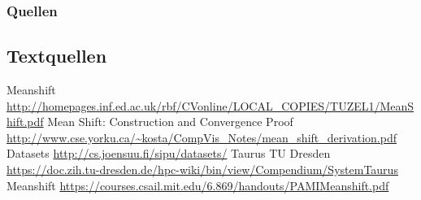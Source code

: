 \documentclass[10pt,utf8]{beamer}
\begin{document}
\begin{frame}
\frametitle{Quellen}
\framesubtitle{}
\tiny
\subsection*{Textquellen}
	\begin{itemize}[]
		\bibitem [0] {} Meanshift \url{http://homepages.inf.ed.ac.uk/rbf/CVonline/LOCAL_COPIES/TUZEL1/MeanShift.pdf}
		\bibitem [1] {} Mean Shift: Construction and Convergence Proof \url{http://www.cse.yorku.ca/~kosta/CompVis_Notes/mean_shift_derivation.pdf}
		\bibitem [2] {} Datasets \url{http://cs.joensuu.fi/sipu/datasets/}
		\bibitem [3] {} Taurus TU Dresden \url{https://doc.zih.tu-dresden.de/hpc-wiki/bin/view/Compendium/SystemTaurus}
		\bibitem [4] {} Meanshift \url{https://courses.csail.mit.edu/6.869/handouts/PAMIMeanshift.pdf}
	\end{itemize}
\end{frame}
\end{document}
